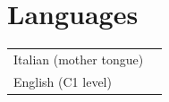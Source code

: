 \documentclass[a4paper,12pt]{article}
\makeatletter
\newenvironment{jobshort}[2]
    {
    \begin{tabularx}{\linewidth}{@{}l X r@{}}
    \textbf{#1} & \hfill &  #2 \\[3.75pt]
    \end{tabularx}
    }
    {
    }
\newenvironment{joblong}[2]
    {
    \begin{tabularx}{\linewidth}{@{}l X r@{}}
    \textbf{#1} & \hfill &  #2 \\[3.75pt]
    \end{tabularx}
    \begin{minipage}[t]{\linewidth}
    \begin{itemize}[nosep,after=\strut, leftmargin=1em, itemsep=3pt,label=--]
    }
    {
    \end{itemize}
    \end{minipage}    
    }
\makeatother
\begin{document}
\section{Languages}
\begin{tabularx}{\linewidth}{@{}l X@{}}
Italian (mother tongue)\\
English (C1 level)\\
\end{tabularx}






  



\nocite{Carlotto,Mazzieri, Marchese}
\printbibliography

\vfill
{}
\end{document}
